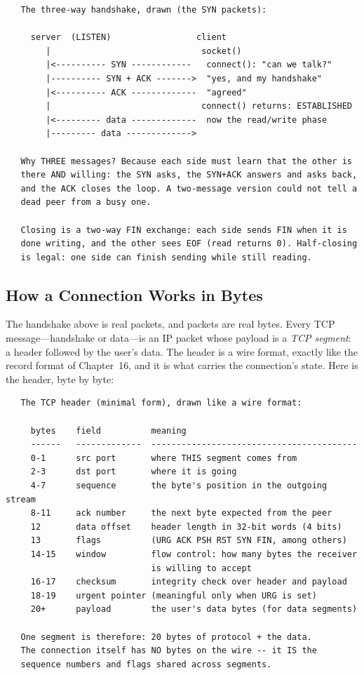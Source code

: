 \begin{verbatim}
   The three-way handshake, drawn (the SYN packets):

     server  (LISTEN)                 client
        |                              socket()
        |<---------- SYN ------------   connect(): "can we talk?"
        |---------- SYN + ACK ------->  "yes, and my handshake"
        |<---------- ACK -------------  "agreed"
        |                              connect() returns: ESTABLISHED
        |<--------- data -------------  now the read/write phase
        |--------- data ------------->

   Why THREE messages? Because each side must learn that the other is
   there AND willing: the SYN asks, the SYN+ACK answers and asks back,
   and the ACK closes the loop. A two-message version could not tell a
   dead peer from a busy one.

   Closing is a two-way FIN exchange: each side sends FIN when it is
   done writing, and the other sees EOF (read returns 0). Half-closing
   is legal: one side can finish sending while still reading.
\end{verbatim}

\subsection{How a Connection Works in Bytes}

The handshake above is real packets, and packets are real bytes. Every
TCP message---handshake or data---is an IP packet whose payload is a
\emph{TCP segment}: a header followed by the user's data. The header
is a wire format, exactly like the record format of Chapter~16, and it
is what carries the connection's state. Here is the header, byte by
byte:

\begin{verbatim}
   The TCP header (minimal form), drawn like a wire format:

     bytes    field          meaning
     ------   -------------  -----------------------------------------
     0-1      src port       where THIS segment comes from
     2-3      dst port       where it is going
     4-7      sequence       the byte's position in the outgoing stream
     8-11     ack number     the next byte expected from the peer
     12       data offset    header length in 32-bit words (4 bits)
     13       flags          (URG ACK PSH RST SYN FIN, among others)
     14-15    window         flow control: how many bytes the receiver
                             is willing to accept
     16-17    checksum       integrity check over header and payload
     18-19    urgent pointer (meaningful only when URG is set)
     20+      payload        the user's data bytes (for data segments)

   One segment is therefore: 20 bytes of protocol + the data.
   The connection itself has NO bytes on the wire -- it IS the
   sequence numbers and flags shared across segments.
\end{verbatim}

